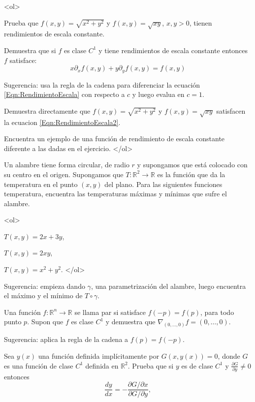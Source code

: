 \documentclass{article}
\theoremstyle{definition}
\begin{document}
  <ol>
  \item Prueba que $f(x,y)=\sqrt{x^2+y^2}$ y  $f(x,y)=\sqrt{xy}$, $x,y>0$,
    tienen rendimientos de escala constante.
  \item Demuestra que si $f$ es clase $C^1$ y tiene rendimientos
    de escala constante entonces $f$ satisface:
    \begin{equation}\label{Eqn:RendimientoEscala2}
    x \partial_x f(x,y) + y \partial_y f(x,y)=f(x,y)
    \end{equation}

    Sugerencia: usa la regla de la cadena para
    diferenciar la ecuación \eqref{Eqn:RendimientoEscala}
    con respecto a $c$ y luego evalua en $c=1$.

  \item Demuestra directamente que $f(x,y)=\sqrt{x^2+y^2}$ y $f(x,y)=\sqrt{xy}$
    satisfacen la ecuacion \eqref{Eqn:RendimientoEscala2}.

  \item Encuentra un ejemplo de una función de rendimiento de escala
    constante diferente a las dadas en el ejercicio.
  </ol>
  
\item Un alambre tiene forma circular, de radio $r$ y supongamos que está
  colocado con su centro en el origen. Supongamos que
  $T:\mathbb{R}^2 \to \mathbb{R}$ es la función que da la temperatura en
  el punto $(x,y)$ del plano. Para las siguientes funciones
  temperatura, encuentra las temperaturas máximas y mínimas
  que sufre el alambre.

  <ol>
  \item $T(x,y)=2x+3y$,
  \item $T(x,y)=2xy$,
  \item $T(x,y)=x^2+y^2$.
  </ol>

  Sugerencia: empieza dando $\gamma$, una parametrización del alambre,
  luego encuentra el máximo y el mínimo de $T\circ \gamma$.
  
  
\item Una función $f:\mathbb{R}^n \to \mathbb{R}$ se llama par si
satisface $f(-p)=f(p)$, para todo punto  $p$. Supon que $f$ es clase
$C^1$ y demuestra que  $\nabla_{(0,\dots, 0)}f=(0,\dots, 0)$.

Sugerencia: aplica la regla de la cadena a $f(p)=f(-p)$. 



\item Sea $y(x)$ una función definida implícitamente por $G(x,y(x))=0$,
  donde $G$ es una función de clase $C^1$ definida en $\mathbb{R}^2$.
  Prueba que si $y$ es de clase
  $C^1$  y  $\frac{\partial G}{\partial y}\ne 0$ entonces
  $$
  \frac{dy}{dx}=-\frac{ \partial G/ \partial x}{\partial G/\partial y}, 
  $$
\end{document}
